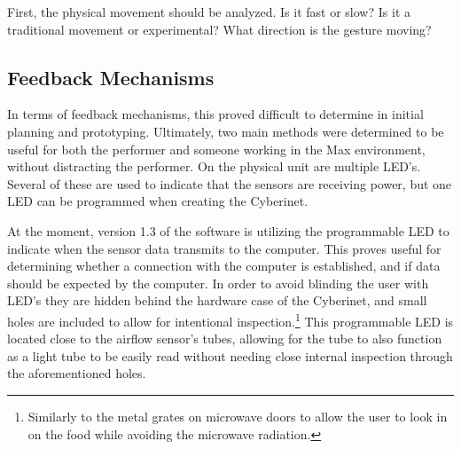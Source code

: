 First, the physical movement should be analyzed. Is it fast or slow? Is it a traditional movement or experimental? What direction is the gesture moving? 

\subsection{Feedback Mechanisms}
In terms of feedback mechanisms, this proved difficult to determine in initial planning and prototyping. Ultimately, two main methods were determined to be useful for both the performer and someone working in the Max environment, without distracting the performer. On the physical unit are multiple LED's. Several of these are used to indicate that the sensors are receiving power, but one LED can be programmed when creating the Cyberinet. 

At the moment, version 1.3 of the software is utilizing the programmable LED to indicate when the sensor data transmits to the computer. This proves useful for determining whether a connection with the computer is established, and if data should be expected by the computer. In order to avoid blinding the user with LED's they are hidden behind the hardware case of the Cyberinet, and small holes are included to allow for intentional inspection.\footnote{Similarly to the metal grates on microwave doors to allow the user to look in on the food while avoiding the microwave radiation.} This programmable LED is located close to the airflow sensor's tubes, allowing for the tube to also function as a light tube to be easily read without needing close internal inspection through the aforementioned holes.

